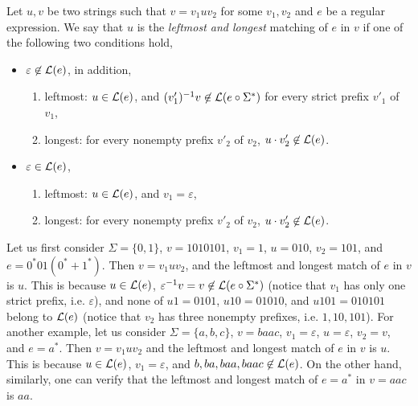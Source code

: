 \begin{definition}
Let $u, v$ be two strings such that $v = v_1 u v_2$ for some $v_1,v_2$ and $e$ be a regular expression. We say that $u$ is the \emph{leftmost and longest} matching of $e$ in $v$ if one of the following two conditions hold,
\begin{itemize}
\item $\varepsilon \not \in \mathcal{L}(e)$, in addition, 
\begin{enumerate}
	\item leftmost: $u \in \mathcal{L}(e)$,  and $(v'_1)^{-1} v \not \in  \mathcal{L}(e \circ \Sigma^*)$ for every strict prefix $v'_1$ of $v_1$, 
	\item longest: for every nonempty prefix $v'_2$ of $v_2$, $u \cdot v'_2 \not \in \mathcal{L}(e)$.
\end{enumerate} 
%
\item $\varepsilon \in \mathcal{L}(e)$, 
\begin{enumerate}
	\item leftmost: $u \in \mathcal{L}(e)$, and $v_1 = \varepsilon$, 
	\item longest: for every nonempty prefix $v'_2$ of $v_2$, $u \cdot v'_2 \not \in \mathcal{L}(e)$.
\end{enumerate} 
\end{itemize}
\end{definition}


\begin{example}
Let us first consider $\Sigma = \{0,1\}$, $v=1010101$, $v_1 =1$, $u = 010$, $v_2 = 101$, and $e = 0^*01(0^*+ 1^*)$. Then $v= v_1 u v_2$, and the leftmost and longest match of $e$ in $v$ is $u$. This is because $u \in \mathcal{L}(e)$, $\varepsilon^{-1} v = v \not \in \mathcal{L}(e \circ \Sigma^*)$ (notice that $v_1$ has only one strict prefix, i.e. $\varepsilon$), and none of $u 1=0101$, $u 10=01010$, and $u101=010101$ belong to $\mathcal{L}(e)$ (notice that $v_2$ has three nonempty prefixes, i.e. $1,10,101$). For another example, let us consider $\Sigma = \{a,b,c\}$, $v=baac$, $v_1 = \varepsilon$, $u =\varepsilon$, $v_2 = v$, and $e = a^*$. Then $v = v_1 u v_2$ and  the leftmost and longest match of $e$ in $v$ is $u$. This is because $u \in \mathcal{L}(e)$, $v_1 = \varepsilon$, and $b, ba, baa, baac \not \in \mathcal{L}(e)$. On the other hand, similarly, one can verify that the leftmost and longest match of $e=a^*$ in $v=aac$ is $aa$.
\end{example}


